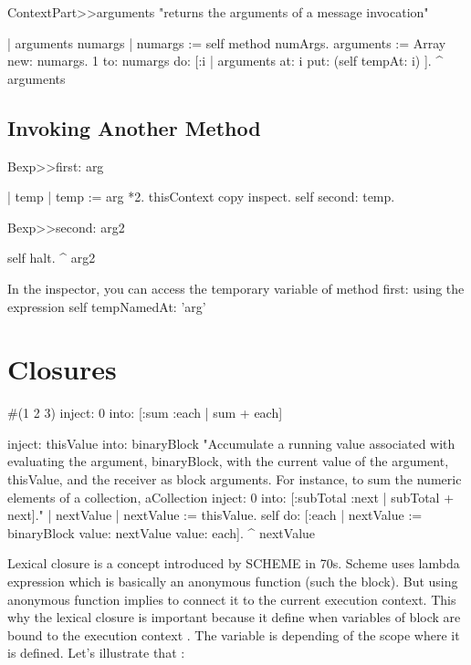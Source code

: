 \documentclass[a4paper,10pt,twoside]{book}
\begin{document}
\begin{code}{}
ContextPart>>arguments
	"returns the arguments of a message invocation"

	| arguments numargs |
	numargs :=  self method numArgs.
	arguments := Array new: numargs.
	1 to: numargs do: [:i | arguments at: i put: (self tempAt: i) ].
	^ arguments
\end{code}


\subsection{Invoking Another Method}
\begin{code}{}
Bexp>>first: arg

	| temp |
	temp := arg *2.
	thisContext copy inspect.
	self second: temp.

Bexp>>second: arg2

	self halt.
	^ arg2
\end{code}

In the inspector, you can access the temporary variable of method first: using the expression self tempNamedAt: 'arg'




\section{Closures}
\begin{code}{}
#(1 2 3) inject: 0 into: [:sum :each | sum + each]
\end{code}

\begin{code}{}
inject: thisValue into: binaryBlock
	"Accumulate a running value associated with evaluating the argument,
	binaryBlock, with the current value of the argument, thisValue, and the
	receiver as block arguments. For instance, to sum the numeric elements of a
	collection, aCollection inject: 0 into: [:subTotal :next | subTotal + next]."
	| nextValue |
	nextValue := thisValue.
	self do: [:each | nextValue := binaryBlock value: nextValue value: each]. 	^ nextValue
\end{code}



Lexical closure is a concept introduced by SCHEME in 70s. Scheme uses lambda expression which is basically an anonymous function (such the block). But using anonymous function implies to connect it to the current execution context. This  why the lexical closure is important because it define when variables of block are bound to the execution context . The variable is depending of the scope where it is defined. Let's illustrate that :
\end{document}
